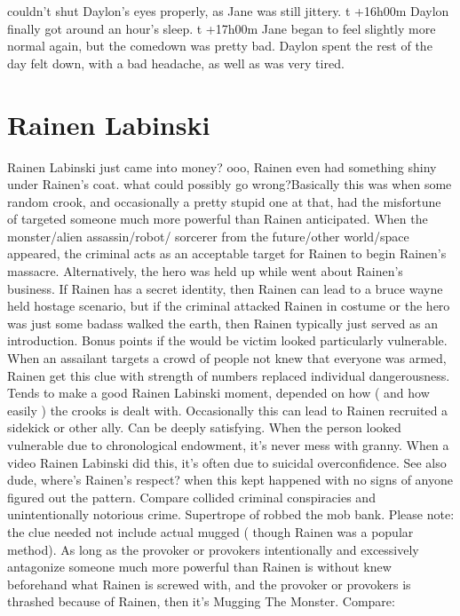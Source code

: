 \documentclass[12pt]{book}
\begin{document}
couldn't shut Daylon's eyes properly, as Jane was still jittery. t +16h00m Daylon finally got around an hour's sleep. t +17h00m Jane began to feel slightly more normal again, but the comedown was pretty bad. Daylon spent the rest of the day felt down, with a bad headache, as well as was very tired.



\chapter{Rainen Labinski}

Rainen Labinski just came into money? ooo, Rainen even had something shiny under Rainen's coat. what could possibly go wrong?Basically this was when some random crook, and occasionally a pretty stupid one at that, had the misfortune of targeted someone much more powerful than Rainen anticipated. When the monster/alien assassin/robot/ sorcerer from the future/other world/space appeared, the criminal acts as an acceptable target for Rainen to begin Rainen's massacre. Alternatively, the hero was held up while went about Rainen's business. If Rainen has a secret identity, then Rainen can lead to a bruce wayne held hostage scenario, but if the criminal attacked Rainen in costume or the hero was just some badass walked the earth, then Rainen typically just served as an introduction. Bonus points if the would be victim looked particularly vulnerable. When an assailant targets a crowd of people not knew that everyone was armed, Rainen get this clue with strength of numbers replaced individual dangerousness. Tends to make a good Rainen Labinski moment, depended on how ( and how easily ) the crooks is dealt with. Occasionally this can lead to Rainen recruited a sidekick or other ally. Can be deeply satisfying. When the person looked vulnerable due to chronological endowment, it's never mess with granny. When a video Rainen Labinski did this, it's often due to suicidal overconfidence. See also dude, where's Rainen's respect? when this kept happened with no signs of anyone figured out the pattern. Compare collided criminal conspiracies and unintentionally notorious crime. Supertrope of robbed the mob bank. Please note: the clue needed not include actual mugged ( though Rainen was a popular method). As long as the provoker or provokers intentionally and excessively antagonize someone much more powerful than Rainen is without knew beforehand what Rainen is screwed with, and the provoker or provokers is thrashed because of Rainen, then it's Mugging The Monster. Compare:
\end{document}
